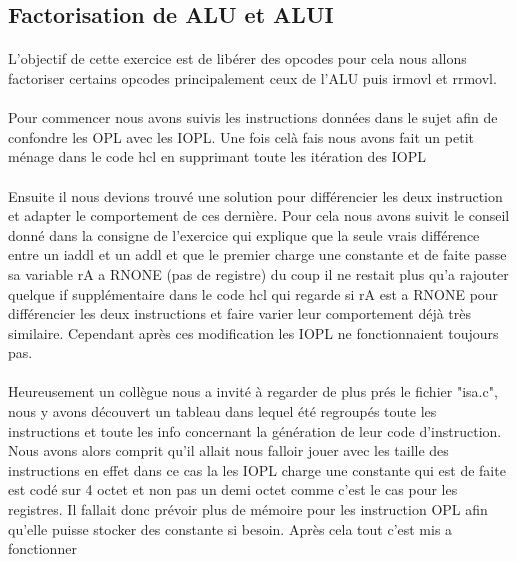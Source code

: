 \documentclass[12pt]{article}
\begin{document}
\subsection{Factorisation de ALU et ALUI}

\paragraph{}L'objectif de cette exercice est de libérer des opcodes pour cela nous allons factoriser certains opcodes principalement ceux de l'ALU puis irmovl et rrmovl.

\paragraph{}Pour commencer nous avons suivis les instructions données dans le sujet afin de confondre les OPL avec les IOPL. Une fois celà fais nous avons fait un petit ménage
dans le code hcl en supprimant toute les itération des IOPL

\paragraph{}Ensuite il nous devions trouvé une solution pour différencier les deux instruction
et adapter le comportement de ces dernière. Pour cela nous avons suivit le conseil
donné dans la consigne de l’exercice qui explique que la seule vrais différence entre un iaddl et un addl et que le premier charge une constante et de faite passe sa variable rA a RNONE (pas de registre) du coup il ne restait plus qu'a rajouter quelque if supplémentaire dans le code hcl qui regarde si rA est a RNONE pour différencier les deux instructions et faire varier leur comportement déjà très similaire. Cependant après ces modification les IOPL ne fonctionnaient toujours pas.

\paragraph{}Heureusement un collègue nous a invité à regarder de plus prés le fichier "isa.c", nous y avons découvert un tableau dans lequel été regroupés toute les instructions
et toute les info concernant la génération de leur code d'instruction. Nous avons alors comprit qu'il allait nous falloir jouer avec les taille des instructions en
effet dans ce cas la les IOPL charge une constante qui est de faite est codé sur
4 octet et non pas un demi octet comme c’est le cas pour les registres. Il fallait donc prévoir plus de mémoire pour les instruction OPL afin qu'elle puisse stocker des constante si besoin. Après cela tout c'est mis a fonctionner
\end{document}

